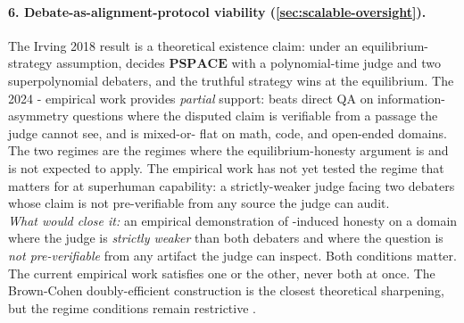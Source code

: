 \paragraph{6. Debate-as-alignment-protocol viability (\cref{sec:scalable-oversight}).}
The Irving 2018 result \citep[Theorem 1]{irving2018-debate} is a
theoretical existence claim: under an equilibrium-strategy
assumption,  decides $\mathbf{PSPACE}$ with a
polynomial-time judge and two superpolynomial debaters, and the
truthful strategy wins at the equilibrium. The 2024 -
empirical work \citep{khan2024-debating-llms} provides
\emph{partial} support:  beats direct QA on
information-asymmetry questions where the disputed claim is
verifiable from a passage the judge cannot see, and is mixed-or-
flat on math, code, and open-ended domains. The two regimes are
the regimes where the equilibrium-honesty argument is and is not
expected to apply. The empirical work has not yet tested the
regime that matters for  at superhuman
capability: a strictly-weaker judge facing two debaters whose
claim is not pre-verifiable from any source the judge can audit.\\
\emph{What would close it:} an empirical demonstration of
-induced honesty on a domain where the judge is
\emph{strictly weaker} than both debaters and where the question
is \emph{not pre-verifiable} from any artifact the judge can
inspect. Both conditions matter. The current empirical work
satisfies one or the other, never both at once. The Brown-Cohen
doubly-efficient construction is the closest theoretical
sharpening, but the regime conditions remain restrictive
\citep{irving2018-debate, khan2024-debating-llms, burns2023-w2s}.

